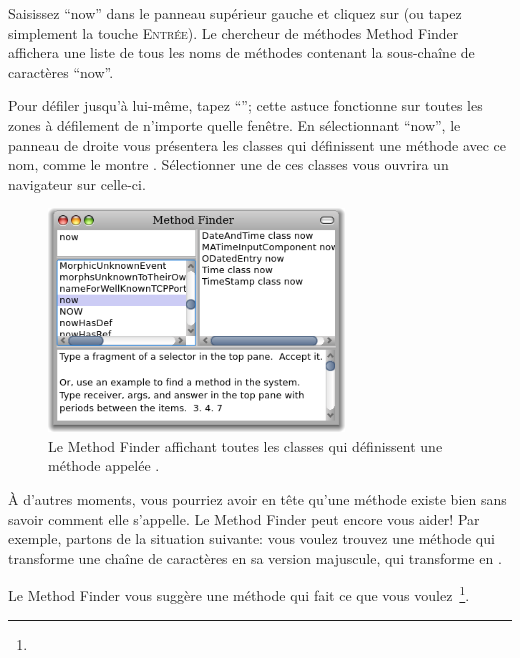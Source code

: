 \documentclass[a4paper,10pt,twoside]{book}
\begin{document}
Saisissez ``now'' dans le panneau supérieur gauche et cliquez sur
 (ou tapez simplement la touche \textsc{Entrée}).
Le chercheur de méthodes Method Finder affichera une liste de tous
les noms de méthodes contenant la sous-chaîne de caractères ``now''.  

Pour défiler jusqu'à  lui-même, tapez ``''; cette
astuce fonctionne sur toutes les zones à défilement de n'importe
quelle fenêtre. En sélectionnant ``now'', le panneau de droite
vous présentera les classes qui définissent une méthode
avec ce nom, comme le montre .
Sélectionner une de ces classes vous ouvrira un navigateur sur
celle-ci.

\begin{figure}[hbt]
\centerline {\includegraphics[width=0.7\textwidth]{methodFinder-now}}
\caption{Le Method Finder affichant toutes les classes qui
  définissent une méthode appelée .
}
\end{figure}

À d'autres moments, vous pourriez avoir en tête qu'une méthode
existe bien sans savoir comment elle s'appelle.
Le Method Finder peut encore vous aider! Par exemple, partons de la
situation suivante: vous voulez trouvez une méthode qui transforme
une chaîne de caractères en sa version majuscule, \cad qui
transforme  en .

\noindent
Le Method Finder vous suggère une méthode qui fait ce
que vous voulez~\footnote{}.
\end{document}
